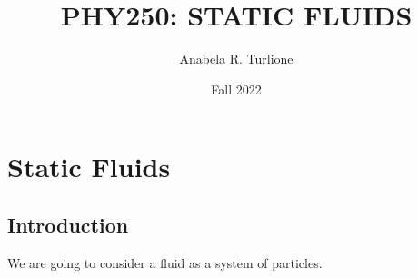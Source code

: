 \documentclass[]{beamer}
\title{PHY250: STATIC FLUIDS}    %
\author{Anabela R. Turlione}                 %
\institute{Digipen}      %
\date{Fall 2022}                    %
\begin{document}
\begin{frame}
  \titlepage
\end{frame}

\section[]{}

\begin{frame}
  \tableofcontents
\end{frame}



\section{Static Fluids}
\subsection{Introduction}

We are going to consider a fluid as a system of particles.

\pause
\end{document}
